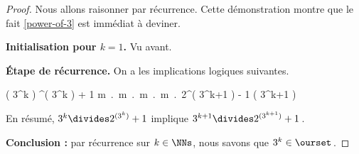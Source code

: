 \begin{proof}
	Nous allons raisonner par récurrence. Cette démonstration montre que le fait \ref{power-of-3} est immédiat à deviner.
    
    \medskip
    
    \textbf{Initialisation pour $k = 1$.}    
    Vu avant.
    
    
    \medskip
    
    \textbf{Étape de récurrence.}    
    On a les implications logiques suivantes.
    
    \medskip
    
    \begin{stepcalc}[style=ar*, ope=\implies]
    	( 3^k ) ^{( 3^k )} + 1
    \explnext{}
    	\exists m \in \ZZ \,.\, \Big[ 2^{( 3^k )} + 1 = m \cdot 3^k  \Big]
    \explnext{}
    	\exists m \in \ZZ \,.\, \Big[ 2^{( 3^k )} = - 1 + m \cdot 3^k  \Big]
    \explnext{}
    	\exists m \in \ZZ \,.\, \Big[ \big( 2^{( 3^k )} \big)^3 = \big( - 1 + m \cdot 3^k \big)^3  \Big]
    \explnext{}
    	\exists m \in \ZZ \,.\, \Big[ 2^{( 3^{k+1} )} = - 1 + 3 \cdot m \cdot 3^k - 3 \cdot \big( m \cdot 3^k \big)^2 + \big( m \cdot 3^k \big)^3  \Big]
    	2^{( 3^{k+1} )} \equiv - 1 \mod\!( 3^{k+1} )
    \end{stepcalc}
    
    \smallskip
    
    En résumé, 
    $3^k \divides 2^{( 3^k )} + 1$ 
    implique
    $3^{k+1} \divides 2^{( 3^{k+1} )} + 1$\,.
    
    \medskip
    
    \textbf{Conclusion :} par récurrence sur $k \in \NNs$, nous savons que $3^k \in \ourset$\,.
\end{proof}


